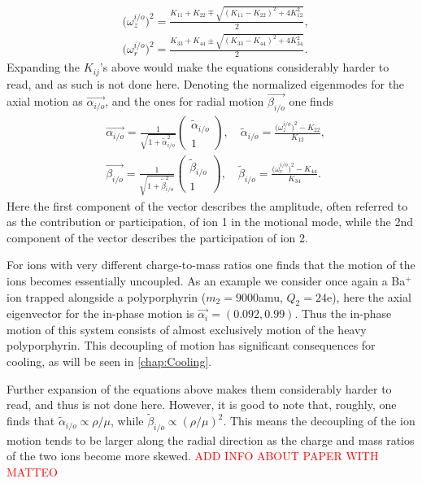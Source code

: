 \begin{align}
    &\big(\omega_z^{i/o}\big)^2 = \frac{K_{11}+K_{22}\mp\sqrt{(K_{11}-K_{22})^2+4K_{12}^2}}{2},\\
    &\big(\omega_r^{i/o}\big)^2 = \frac{K_{33}+K_{44}\pm\sqrt{(K_{33}-K_{44})^2+4K_{34}^2}}{2}.
\end{align}
Expanding the $K_{ij}$'s above would make the equations considerably harder to read, and as such is not done here. Denoting the normalized eigenmodes for the axial motion as $\vec{\alpha_{i/o}}$, and the ones for radial motion $\vec{\beta_{i/o}}$ one finds
\begin{align}
    &\vec{\alpha_{i/o}} = \frac{1}{\sqrt{1+\tilde{\alpha}_{i/o}^2}}
    \begin{pmatrix}
        \tilde{\alpha}_{i/o} \\
        1
    \end{pmatrix},\quad \tilde{\alpha}_{i/o} = \frac{\big(\omega_z^{i/o}\big)^2-K_{22}}{K_{12}},\\
    &\vec{\beta_{i/o}} = \frac{1}{\sqrt{1+\tilde{\beta}_{i/o}^2}}
    \begin{pmatrix}
        \tilde{\beta}_{i/o} \\
        1
    \end{pmatrix},\quad \tilde{\beta}_{i/o} = \frac{\big(\omega_r^{i/o}\big)^2-K_{44}}{K_{34}}.
\end{align}
Here the first component of the vector describes the amplitude, often referred to as the contribution or participation, of ion 1 in the motional mode, while the 2nd component of the vector describes the participation of ion 2.


For ions with very different charge-to-mass ratios one finds that the motion of the ions becomes essentially uncoupled. As an example we consider once again a Ba$^+$ ion trapped alongside a polyporphyrin ($m_2 = 9000$amu, $Q_2 = 24$e), here the axial eigenvector for the in-phase motion is $\vec{\alpha_{i}} = (0.092,0.99)$. Thus the in-phase motion of this system consists of almost exclusively motion of the heavy polyporphyrin. This decoupling of motion has significant consequences for cooling, as will be seen in \cref{chap:Cooling}.


Further expansion of the equations above makes them considerably harder to read, and thus is not done here. However, it is good to note that, roughly, one finds that $\tilde{\alpha}_{i/o}\propto\rho/\mu$, while $\tilde{\beta}_{i/o}\propto(\rho/\mu)^2$. This means the decoupling of the ion motion tends to be larger along the radial direction as the charge and mass ratios of the two ions become more skewed.
\textcolor{red}{ADD INFO ABOUT PAPER WITH MATTEO}